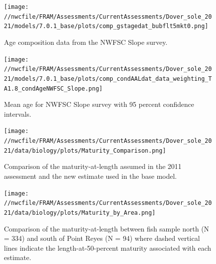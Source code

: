 \documentclass[11pt,
  english,
  a4paper,
]{article}
\begin{document}

\begin{figure}
\centering
\texttt{[image: //nwcfile/FRAM/Assessments/CurrentAssessments/Dover\_sole\_2021/models/7.0.1\_base/plots/comp\_gstagedat\_bubflt5mkt0.png]}
\caption{Age composition data from the NWFSC Slope survey.\label{fig:nw-slope-age-data}}
\end{figure}

\tagmcend\tagstructend


\begin{figure}
\centering
\texttt{[image: //nwcfile/FRAM/Assessments/CurrentAssessments/Dover\_sole\_2021/models/7.0.1\_base/plots/comp\_condAALdat\_data\_weighting\_TA1.8\_condAgeNWFSC\_Slope.png]}
\caption{Mean age for NWFSC Slope survey with 95 percent confidence intervals.\label{fig:mean-nw-slope-age-data}}
\end{figure}

\tagmcend\tagstructend


\begin{figure}
\centering
\texttt{[image: //nwcfile/FRAM/Assessments/CurrentAssessments/Dover\_sole\_2021/data/biology/plots/Maturity\_Comparison.png]}
\caption{Comparison of the maturity-at-length assumed in the 2011 assessment and the new estimate used in the base model.\label{fig:compare-mat-at-len}}
\end{figure}

\tagmcend\tagstructend


\begin{figure}
\centering
\texttt{[image: //nwcfile/FRAM/Assessments/CurrentAssessments/Dover\_sole\_2021/data/biology/plots/Maturity\_by\_Area.png]}
\caption{Comparison of the maturity-at-length between fish sample north (N = 334) and south of Point Reyes (N = 94) where dashed vertical lines indicate the length-at-50-percent maturity associated with each estimate.\label{fig:spat-mat-at-len}}
\end{figure}
\end{document}
